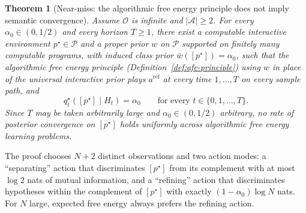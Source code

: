 \documentclass[11pt]{article}
\newtheorem{theorem}{Theorem}[section]
\theoremstyle{definition}
\theoremstyle{remark}
\newcommand{\Acal}{\mathcal{A}}
\newcommand{\Ocal}{\mathcal{O}}
\newcommand{\Pcal}{\mathcal{P}}
\begin{document}
\begin{theorem}[Near-miss: the algorithmic free energy principle does not imply semantic convergence]
\label{thm:afe-near-miss}
Assume $\Ocal$ is infinite and $|\Acal|\ge 2$. For every $\alpha_0\in(0,1/2)$ and every horizon $T\ge 1$, there exist a computable interactive environment $p^\star\in\Pcal$ and a proper prior $w$ on $\Pcal$ supported on finitely many computable programs, with induced class prior $\bar w([p^\star])=\alpha_0$, such that the algorithmic free energy principle (Definition~\ref{def:afe-principle}) using $w$ in place of the universal interactive prior plays $a^{\mathrm{ref}}$ at every time $1,\dots,T$ on every sample path, and
\[
q_t^\star([p^\star]\mid H_t)=\alpha_0
\qquad\text{for every }t\in\{0,1,\dots,T\}.
\]
Since $T$ may be taken arbitrarily large and $\alpha_0\in(0,1/2)$ arbitrary, no rate of posterior convergence on $[p^\star]$ holds uniformly across algorithmic free energy learning problems.
\end{theorem}

The proof chooses $N+2$ distinct observations and two action modes: a ``separating'' action that discriminates $[p^\star]$ from its complement with at most $\log 2$ nats of mutual information, and a ``refining'' action that discriminates hypotheses within the complement of $[p^\star]$ with exactly $(1-\alpha_0)\log N$ nats. For $N$ large, expected free energy always prefers the refining action.
\end{document}
